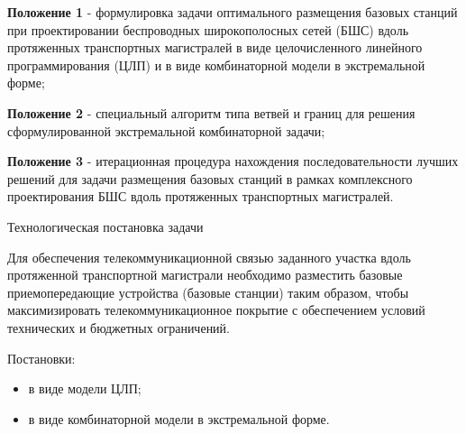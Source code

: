 \begin{frame}
    \justifying
    \begin{center}
        \fontsize{8pt}{7.2}\selectfont
        {\textbf{Положение 1} - формулировка задачи оптимального размещения базовых станций при проектировании беспроводных широкополосных сетей (БШС) вдоль протяженных транспортных магистралей в виде целочисленного линейного программирования (ЦЛП) и в виде комбинаторной модели в экстремальной форме;}
        \bigskip
        
        {\textbf{Положение 2} - специальный алгоритм типа ветвей и границ для решения сформулированной экстремальной комбинаторной задачи;}
        \bigskip

        {\textbf{Положение 3} - итерационная процедура нахождения последовательности лучших решений для задачи размещения базовых станций в рамках комплексного проектирования БШС вдоль протяженных транспортных магистралей.}
    \end{center}

    \begin{minipage}[t]{0.5\linewidth} 
        
    \end{minipage}
    \hfill
    \begin{minipage}[t]{0.4\linewidth}
    \end{minipage}

\end{frame}

\begin{frame}
    {Технологическая постановка задачи} 
    \justifying
    
    Для обеспечения телекоммуникационной связью заданного участка вдоль протяженной транспортной магистрали необходимо разместить базовые приемопередающие устройства (базовые станции) таким образом, чтобы максимизировать телекоммуникационное покрытие с обеспечением условий технических и бюджетных ограничений. 

    \bigskip
    
    Постановки:
    \begin{itemize}
        \item в виде модели ЦЛП;
        \item в виде комбинаторной модели в экстремальной форме.
    \end{itemize}

\end{frame}

